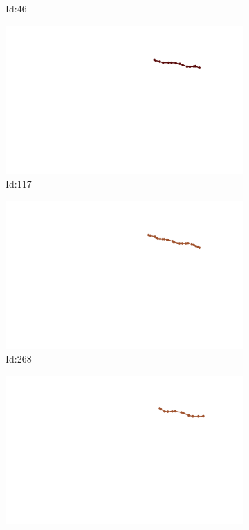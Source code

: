 \documentclass[12pt,twoside]{report}
\begin{document}
\begin{figure}
\begin{subfigure}[b]{0.20\textwidth}
\caption{Id:46}
\end{subfigure}
\begin{subfigure}[b]{0.20\textwidth}
\centering
\includegraphics[width=\textwidth]{../../trajectories/117.png}
\caption{Id:117}
\end{subfigure}
\begin{subfigure}[b]{0.20\textwidth}
\centering
\includegraphics[width=\textwidth]{../../trajectories/268.png}
\caption{Id:268}
\end{subfigure}
\begin{subfigure}[b]{0.20\textwidth}
\centering
\includegraphics[width=\textwidth]{../../trajectories/289.png}

\end{subfigure}
\end{figure}
\end{document}
